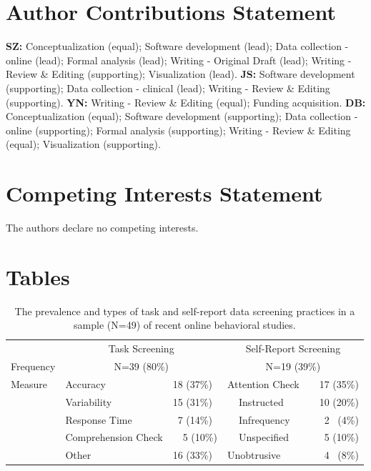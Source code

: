 \documentclass[a4paper,notitlepage,12pt]{article}
\begin{document}
\section*{Author Contributions Statement}

\textbf{SZ:} Conceptualization (equal); Software development (lead); Data collection - online (lead); Formal analysis (lead); Writing - Original Draft (lead); Writing - Review \& Editing (supporting); Visualization (lead). \textbf{JS:} Software development (supporting); Data collection - clinical (lead); Writing - Review \& Editing (supporting). \textbf{YN:} Writing - Review \& Editing (equal); Funding acquisition. \textbf{DB:} Conceptualization (equal); Software development (supporting); Data collection - online (supporting); Formal analysis (supporting); Writing - Review \& Editing (equal); Visualization (supporting).

\section*{Competing Interests Statement}

The authors declare no competing interests.

\clearpage
\section*{Tables}

\begin{table}[h]
    \centering
    \small
    \setlength{\tabcolsep}{8pt}
    \begin{tabular}{lllrllr}
        \toprule
        & \multicolumn{2}{c}{Task Screening} & \multicolumn{4}{c}{Self-Report Screening} \\
        \cmidrule(lr){2-3} \cmidrule(lr){4-7}
        Frequency & \multicolumn{2}{c}{N=39 (80\%)} & \multicolumn{4}{c}{N=19 (39\%)} \\
        \midrule
        Measure & Accuracy & 18 (37\%) & \multicolumn{2}{l}{Attention Check} & & 17 (35\%) \\
        & Variability & 15 (31\%) & & Instructed & & 10 (20\%) \\
        & Response Time & \ 7 (14\%) & & Infrequency & & 2 \, (4\%) \\
        & Comprehension Check & \ \ 5 (10\%) & & Unspecified & & 5 (10\%) \\
        & Other & 16 (33\%) & \multicolumn{2}{l}{Unobtrusive} & & \ 4 \, (8\%) \\
        \bottomrule
    \end{tabular}
    \caption{The prevalence and types of task and self-report data screening practices in a sample (N=49) of recent online behavioral studies.}
    \label{tab:tab01}
\end{table}
\end{document}
